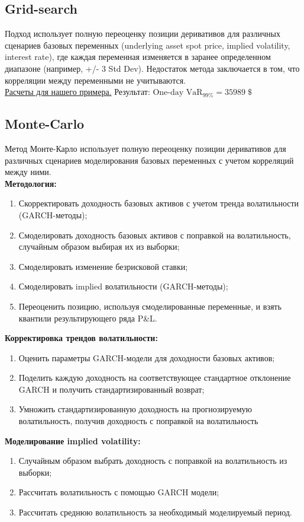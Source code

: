 \documentclass{article}
\begin{document}
\subsection{Grid-search}
Подход использует полную переоценку
позиции деривативов для различных
сценариев базовых переменных (underlying asset spot price, implied volatility, interest rate), где каждая переменная изменяется в
заранее определенном диапазоне (например, +/- 3 Std Dev). Недостаток метода заключается в том, что корреляции между переменными не учитываются.\\ \href{https://youtu.be/ev2jSbH9G9U?t=2789}{Расчеты для нашего примера.}
Результат: $\text{One-day } \text{VaR}_{99\%} = 35989 \;\$ $
\subsection{Monte-Carlo}
Метод Монте-Карло использует полную переоценку позиции деривативов для различных сценариев моделирования базовых переменных с учетом корреляций между ними.\\


\textbf{Методология:}
\begin{enumerate}
\item
Скорректировать доходность базовых активов с учетом тренда волатильности (GARCH-методы);
\item
Смоделировать доходность базовых
активов с поправкой на волатильность, случайным образом выбирая их из выборки;
\item
Смоделировать изменение безрисковой ставки;
\item 
Смоделировать implied волатильности (GARCH-методы);
\item
Переоценить позицию, используя смоделированные переменные, и
взять квантили результирующего ряда P\!\&\!L.
\end{enumerate}
\textbf{Корректировка трендов волатильности:}
\begin{enumerate}
\item
Оценить параметры GARCH-модели для доходности
базовых активов;
\item 
Поделить каждую доходность на соответствующее
стандартное отклонение GARCH и получить стандартизированный возврат;
\item
Умножить стандартизированную доходность на
прогнозируемую волатильность, получив доходность с поправкой на волатильность
\end{enumerate}
\textbf{Моделирование implied volatility:}
\begin{enumerate}
\item
Случайным образом выбрать доходность с поправкой на волатильность из выборки;
\item 
Рассчитать волатильность с помощью GARCH модели;
\item
Рассчитать среднюю волатильность за необходимый
моделируемый период.
\end{enumerate}
\end{document}

